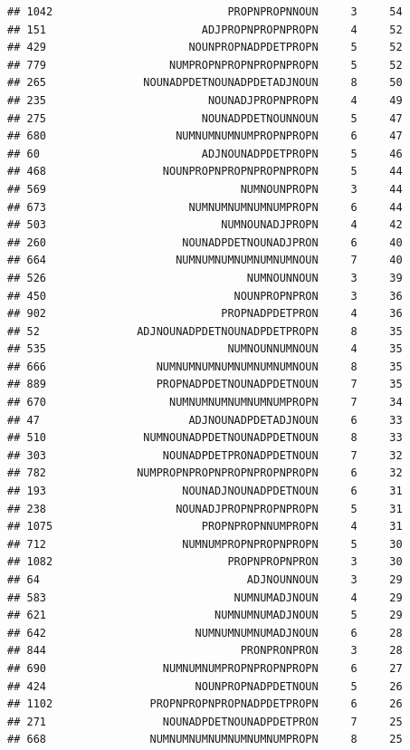 \documentclass[]{article}
\begin{document}
\begin{verbatim}
## 1042                           PROPNPROPNNOUN     3     54
## 151                        ADJPROPNPROPNPROPN     4     52
## 429                      NOUNPROPNADPDETPROPN     5     52
## 779                   NUMPROPNPROPNPROPNPROPN     5     52
## 265               NOUNADPDETNOUNADPDETADJNOUN     8     50
## 235                         NOUNADJPROPNPROPN     4     49
## 275                        NOUNADPDETNOUNNOUN     5     47
## 680                    NUMNUMNUMNUMPROPNPROPN     6     47
## 60                         ADJNOUNADPDETPROPN     5     46
## 468                  NOUNPROPNPROPNPROPNPROPN     5     44
## 569                              NUMNOUNPROPN     3     44
## 673                      NUMNUMNUMNUMNUMPROPN     6     44
## 503                           NUMNOUNADJPROPN     4     42
## 260                     NOUNADPDETNOUNADJPRON     6     40
## 664                    NUMNUMNUMNUMNUMNUMNOUN     7     40
## 526                               NUMNOUNNOUN     3     39
## 450                             NOUNPROPNPRON     3     36
## 902                           PROPNADPDETPRON     4     36
## 52               ADJNOUNADPDETNOUNADPDETPROPN     8     35
## 535                            NUMNOUNNUMNOUN     4     35
## 666                 NUMNUMNUMNUMNUMNUMNUMNOUN     8     35
## 889                 PROPNADPDETNOUNADPDETNOUN     7     35
## 670                   NUMNUMNUMNUMNUMNUMPROPN     7     34
## 47                       ADJNOUNADPDETADJNOUN     6     33
## 510               NUMNOUNADPDETNOUNADPDETNOUN     8     33
## 303                  NOUNADPDETPRONADPDETNOUN     7     32
## 782              NUMPROPNPROPNPROPNPROPNPROPN     6     32
## 193                     NOUNADJNOUNADPDETNOUN     6     31
## 238                    NOUNADJPROPNPROPNPROPN     5     31
## 1075                       PROPNPROPNNUMPROPN     4     31
## 712                     NUMNUMPROPNPROPNPROPN     5     30
## 1082                           PROPNPROPNPRON     3     30
## 64                                ADJNOUNNOUN     3     29
## 583                             NUMNUMADJNOUN     4     29
## 621                          NUMNUMNUMADJNOUN     5     29
## 642                       NUMNUMNUMNUMADJNOUN     6     28
## 844                              PRONPRONPRON     3     28
## 690                  NUMNUMNUMPROPNPROPNPROPN     6     27
## 424                       NOUNPROPNADPDETNOUN     5     26
## 1102               PROPNPROPNPROPNADPDETPROPN     6     26
## 271                  NOUNADPDETNOUNADPDETPRON     7     25
## 668                NUMNUMNUMNUMNUMNUMNUMPROPN     8     25

\end{verbatim}
\end{document}
